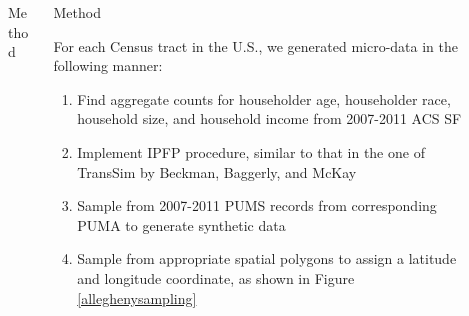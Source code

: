\documentclass[final, 14pt]{beamer}
\newlength{\sepwid}
\newlength{\onecolwid}
\newlength{\twocolwid}
\begin{document}
\begin{frame}[t]
\begin{columns}[t]
\begin{column}{\twocolwid}
\begin{columns}[t,totalwidth=\twocolwid]
\begin{column}{\onecolwid}
\begin{block}{Method}
\begin{enumerate}
\end{enumerate}

\end{block}


\end{column} %

\begin{column}{\onecolwid} %

\begin{block}{Method}

For each Census tract in the U.S., we generated micro-data in the following manner:
  
\begin{enumerate}
\item Find aggregate counts for householder age, householder race, household size, and household income from 2007-2011 ACS SF
\item Implement IPFP procedure, similar to that in the one of TransSim by Beckman, Baggerly, and McKay \cite{beckman.baggerly.mckay96}
\item Sample from 2007-2011  PUMS records from corresponding PUMA to generate synthetic data
\item Sample from appropriate spatial polygons to assign a latitude and longitude coordinate, as shown in Figure \ref{alleghenysampling}

\end{enumerate}

\end{block}


\end{column} %

\end{columns} %

\end{column} %


\begin{column}{\sepwid}\end{column} %

\begin{column}{\onecolwid} %


\end{column}
\end{columns}
\end{frame}
\end{document}
